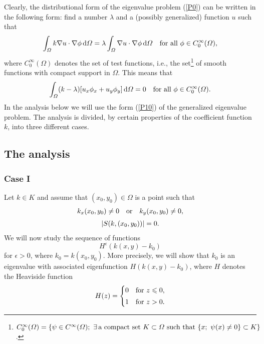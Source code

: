 \documentclass{imanum}
\begin{document}
Clearly, the distributional form of the eigenvalue problem (\ref{P0})
can be written in the following form: find a number $\lambda$ and
a (possibly generalized) function $u$ such that
\begin{equation}
\int_\Omega k \nabla u \cdot \nabla \phi \, \mathrm{d} \Omega =
\lambda \int_\Omega \nabla u \cdot \nabla \phi \, \mathrm{d} \Omega
\quad \hbox{for all}\ \phi \in C^\infty_0(\Omega) ,
\label{P9}
\end{equation}
where $C^\infty_0(\Omega)$ denotes the set of test functions, i.e., the
set\footnote{$C^{\infty}_0(\Omega)=\{\psi \in C^{\infty}(\Omega);\
\exists\,\hbox{a compact set }K \subset \Omega \hbox{ such that }
\{x;\ \psi(x) \neq 0 \} \subset K \}$.}
of smooth functions with compact support in $\Omega$.
This means that
\begin{equation}
\int_\Omega (k-\lambda) [u_x \phi_x + u_y \phi_y] \, \mathrm{d} \Omega
= 0 \quad \hbox{for all}\ \phi \in C^\infty_0(\Omega) .
\label{P10}
\end{equation}
In the analysis below we will use the form (\ref{P10}) of the
generalized eigenvalue problem. The analysis is divided, by certain
properties of the coefficient function $k$, into three different cases.


\subsection{The analysis}
\label{sec4.2}

\subsubsection{Case I}
\label{sec4.2.1}

Let $k \in K$ and assume that $(x_0,y_0) \in \Omega$ is a point such that
\begin{gather}
k_x(x_0,y_0) \neq 0 \quad \hbox{or} \quad k_y(x_0,y_0) \neq 0,
\label{P10.1}\\[3pt]
|S(k,(x_0,y_0))| =0.
\label{P10.2}
\end{gather}
We will now study the sequence of functions
\begin{equation*}
H^{\epsilon}(k(x,y)-k_0)
\end{equation*}
for $\epsilon > 0$, where $k_0=k(x_0,y_0)$. More precisely, we will show
that $k_0$ is an eigenvalue with associated eigenfunction $H(k(x,y)-k_0)$,
where $H$ denotes the Heaviside function
\begin{equation}
H(z) =
\begin{cases}
0 & \hbox{for } z \leq 0, \\[2pt]
1 & \hbox{for } z > 0.
\end{cases}
\label{P10.3}
\end{equation}
\end{document}
